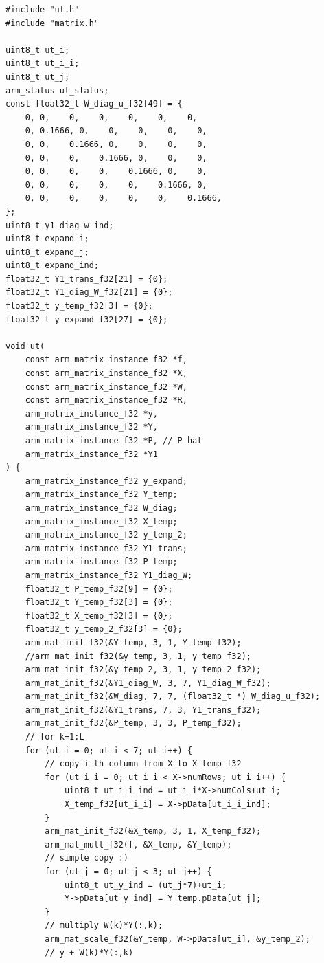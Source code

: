 \begin{lstlisting}[caption=ut.c]
#include "ut.h"
#include "matrix.h"

uint8_t ut_i;
uint8_t ut_i_i;
uint8_t ut_j;
arm_status ut_status;
const float32_t W_diag_u_f32[49] = {
    0, 0,    0,    0,    0,    0,    0,
    0, 0.1666, 0,    0,    0,    0,    0,
    0, 0,    0.1666, 0,    0,    0,    0,
    0, 0,    0,    0.1666, 0,    0,    0,
    0, 0,    0,    0,    0.1666, 0,    0,
    0, 0,    0,    0,    0,    0.1666, 0,
    0, 0,    0,    0,    0,    0,    0.1666,
};
uint8_t y1_diag_w_ind;
uint8_t expand_i;
uint8_t expand_j;
uint8_t expand_ind;
float32_t Y1_trans_f32[21] = {0};
float32_t Y1_diag_W_f32[21] = {0};
float32_t y_temp_f32[3] = {0};
float32_t y_expand_f32[27] = {0};

void ut(
    const arm_matrix_instance_f32 *f,
    const arm_matrix_instance_f32 *X,
    const arm_matrix_instance_f32 *W,
    const arm_matrix_instance_f32 *R,
    arm_matrix_instance_f32 *y,
    arm_matrix_instance_f32 *Y,
    arm_matrix_instance_f32 *P, // P_hat
    arm_matrix_instance_f32 *Y1
) {
    arm_matrix_instance_f32 y_expand;
    arm_matrix_instance_f32 Y_temp;
    arm_matrix_instance_f32 W_diag;
    arm_matrix_instance_f32 X_temp;
    arm_matrix_instance_f32 y_temp_2;
    arm_matrix_instance_f32 Y1_trans;
    arm_matrix_instance_f32 P_temp;
    arm_matrix_instance_f32 Y1_diag_W;
    float32_t P_temp_f32[9] = {0};
    float32_t Y_temp_f32[3] = {0};
    float32_t X_temp_f32[3] = {0};
    float32_t y_temp_2_f32[3] = {0};
    arm_mat_init_f32(&Y_temp, 3, 1, Y_temp_f32);
    //arm_mat_init_f32(&y_temp, 3, 1, y_temp_f32);
    arm_mat_init_f32(&y_temp_2, 3, 1, y_temp_2_f32);
    arm_mat_init_f32(&Y1_diag_W, 3, 7, Y1_diag_W_f32);
    arm_mat_init_f32(&W_diag, 7, 7, (float32_t *) W_diag_u_f32);
    arm_mat_init_f32(&Y1_trans, 7, 3, Y1_trans_f32);
    arm_mat_init_f32(&P_temp, 3, 3, P_temp_f32);
    // for k=1:L
    for (ut_i = 0; ut_i < 7; ut_i++) {
        // copy i-th column from X to X_temp_f32
        for (ut_i_i = 0; ut_i_i < X->numRows; ut_i_i++) {
            uint8_t ut_i_i_ind = ut_i_i*X->numCols+ut_i;
            X_temp_f32[ut_i_i] = X->pData[ut_i_i_ind];
        }
        arm_mat_init_f32(&X_temp, 3, 1, X_temp_f32);
        arm_mat_mult_f32(f, &X_temp, &Y_temp);
        // simple copy :)
        for (ut_j = 0; ut_j < 3; ut_j++) {
            uint8_t ut_y_ind = (ut_j*7)+ut_i;
            Y->pData[ut_y_ind] = Y_temp.pData[ut_j];
        }
        // multiply W(k)*Y(:,k);
        arm_mat_scale_f32(&Y_temp, W->pData[ut_i], &y_temp_2);
        // y + W(k)*Y(:,k)

\end{lstlisting}
